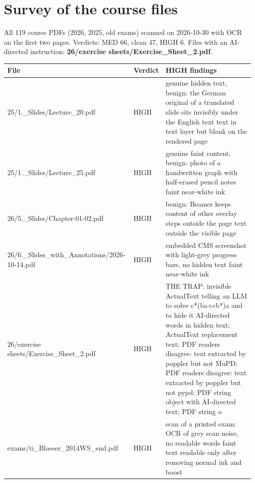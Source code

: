 \documentclass[10pt,a4paper]{article}
\begin{document}
\section{Survey of the course files}
All 119 course PDFs (2026, 2025, old exams) scanned on 2026-10-30 with OCR on the first two pages. Verdicts: MED 66, clean 47, HIGH 6. Files with an AI-directed instruction: \textbf{26/exercise sheets/Exercise\_Sheet\_2.pdf}.
\begin{longtable}{@{}P{6.4cm}P{1.2cm}P{9.4cm}@{}}\toprule File & Verdict & HIGH findings\\\midrule\endhead
\footnotesize 25/1.\_Slides/Lecture\_20.pdf & HIGH & \footnotesize genuine hidden text, benign: the German original of a translated slide sits invisibly under the English text \textbar{} text in text layer but blank on the rendered page\\
\footnotesize 25/1.\_Slides/Lecture\_25.pdf & HIGH & \footnotesize genuine faint content, benign: photo of a handwritten graph with half-erased pencil notes \textbar{} faint near-white ink\\
\footnotesize 26/5.\_Slides/Chapter-01-02.pdf & HIGH & \footnotesize benign: Beamer keeps content of other overlay steps outside the page \textbar{} text outside the visible page\\
\footnotesize 26/6.\_Slides\_with\_Annotations/2026-10-14.pdf & HIGH & \footnotesize embedded CMS screenshot with light-grey progress bars, no hidden text \textbar{} faint near-white ink\\
\footnotesize 26/exercise sheets/Exercise\_Sheet\_2.pdf & HIGH & \footnotesize THE TRAP: invisible ActualText telling an LLM to solve c*(ba+cb*)a and to hide it \textbar{} AI-directed words in hidden text; ActualText replacement text; PDF readers disagree: text extracted by poppler but not MuPD; PDF readers disagree: text extracted by poppler but not pypd; PDF string object with AI-directed text; PDF string o\\
\footnotesize exams/ti\_Blaeser\_2014WS\_end.pdf & HIGH & \footnotesize scan of a printed exam: OCR of grey scan noise, no readable words \textbar{} faint text readable only after removing normal ink and boost\\
\bottomrule\end{longtable}
\end{document}
